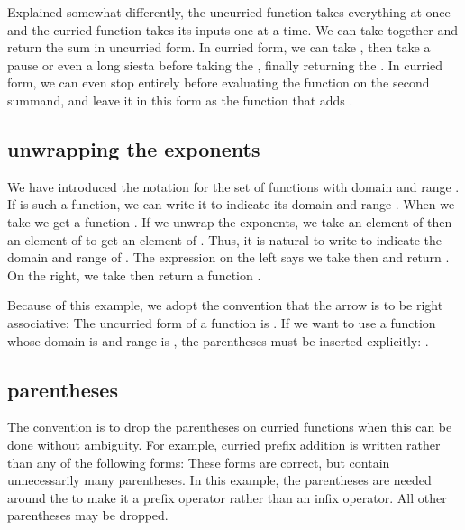 \documentclass[cup9a]{cupbook}
\begin{document}
Explained somewhat differently, the uncurried function takes everything at once and the curried function takes its inputs one at a time.  We can take  together and return the sum  in uncurried form.  In curried form, we can take , then take a pause or even a long siesta before taking the , finally returning the .  In curried form, we can even stop entirely before evaluating the function  on the second summand, and leave it in this form as the function that adds .

\subsection{unwrapping the exponents}

We have introduced the notation  for the set of functions with domain  and range .    If  is such a function, we can write it
 to indicate its domain  and range .  When we take
 we get a function .  If we unwrap the exponents, we
take an element of  then an element of  to get an element of .
Thus, it is natural to write
to indicate the domain and range of .  The expression on the left
says we take  then  and return .  On the
right, we take  then return a function .

Because of this example, we adopt the convention that the arrow \mc{$\to$}
is to be right associative:
The uncurried form of a function  is .
If we want to use a function  whose domain is  and range is ,
the parentheses must be inserted explicitly: .

\subsection{parentheses}

The convention is to drop the parentheses on curried functions when this can be done without ambiguity.  For example, curried prefix addition is written
rather than any of the following forms:
These forms are correct, but contain unnecessarily many parentheses.
In this example, the parentheses are needed around the \mc{$(+)$} to make it
a prefix operator rather than an infix operator. All other parentheses may
be dropped.
\end{document}
